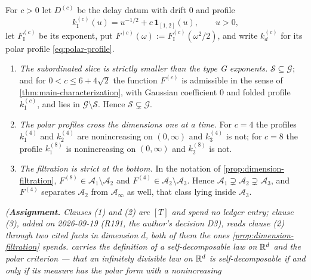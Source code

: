 \begin{lemma}
\label{lem:filtration-strictness}
\notready
For $c > 0$ let $D^{(c)}$ be the delay datum with drift $0$ and profile
\[
  k^{(c)}_{\mathrm I}(u) = u^{-1/2} + c\,\mathbf{1}_{[1,2]}(u), \qquad u > 0 ,
\]
let $F^{(c)}_{\mathrm I}$ be its exponent, put
$F^{(c)}(\omega) := F^{(c)}_{\mathrm I}(\omega^2/2)$, and write $k^{(c)}_d$ for its polar profile
\ref{eq:polar-profile}.
\begin{enumerate}
\item \emph{The subordinated slice is strictly smaller than the type G exponents.}
$\mathcal{S} \subseteq \mathcal{G}$; and for $0 < c \le 6 + 4\sqrt2$ the function $F^{(c)}$ is
admissible in the sense of \ref{thm:main-characterization}, with Gaussian coefficient $0$ and
folded profile $k^{(c)}_1$, and lies in $\mathcal{G} \setminus \mathcal{S}$. Hence
$\mathcal{S} \subsetneq \mathcal{G}$.
\item \emph{The polar profiles cross the dimensions one at a time.} For $c = 4$ the profiles
$k^{(4)}_1$ and $k^{(4)}_2$ are nonincreasing on $(0,\infty)$ and $k^{(4)}_3$ is not; for $c = 8$
the profile $k^{(8)}_1$ is nonincreasing on $(0,\infty)$ and $k^{(8)}_2$ is not.
\item \emph{The filtration is strict at the bottom.} In the notation of
\ref{prop:dimension-filtration}, $F^{(8)} \in \mathcal{A}_1 \setminus \mathcal{A}_2$ and
$F^{(4)} \in \mathcal{A}_2 \setminus \mathcal{A}_3$. Hence
$\mathcal{A}_1 \supsetneq \mathcal{A}_2 \supsetneq \mathcal{A}_3$, and $F^{(4)}$ separates
$\mathcal{A}_2$ from $\mathcal{A}_\infty$ as well, that class lying inside $\mathcal{A}_3$.
\end{enumerate}
\statusA\quad{}\quad{}\quad\emph{(\textbf{Assignment.} Clauses (1) and (2) are
$[T]$ and spend no ledger entry; clause (3), added on 2026-09-19 (R191, the author's decision D3),
reads clause (2) through two cited facts in dimension $d$, both of them the ones
\ref{prop:dimension-filtration} spends.  carries the definition of a self-decomposable
law on $\mathbb{R}^d$ and the polar criterion --- that an infinitely divisible law on $\mathbb{R}^d$ is
self-decomposable if and only if its \Levy{} measure has the polar form with a nonincreasing
}
\end{lemma}
